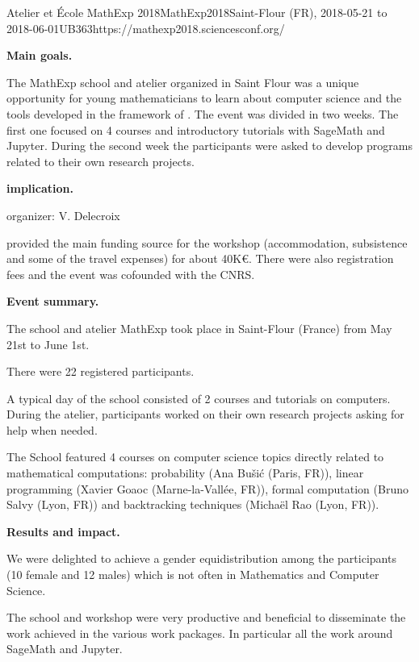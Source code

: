 \begin{event}{Atelier et \'Ecole MathExp 2018}{MathExp2018}{Saint-Flour (FR),
2018-05-21 to 2018-06-01}{UB}{36}{3}{https://mathexp2018.sciencesconf.org/}

\textbf{Main goals.}

The MathExp school and atelier organized in Saint Flour was a unique
opportunity for young mathematicians to learn about computer science
and the tools developed in the framework of \ODK. The event
was divided in two weeks. The first one focused on 4 courses and
introductory tutorials with SageMath and Jupyter. During the second
week the participants were asked to develop programs related to their
own research projects.

\textbf{\ODK implication.}

\ODK organizer: V. Delecroix

\ODK provided the main funding source for the workshop (accommodation,
subsistence and some of the travel expenses) for about 40K\euro. There were
also registration fees and the event was cofounded with the CNRS.

\textbf{Event summary.}

The school and atelier MathExp took place in Saint-Flour (France)
from May 21st to June 1st.

There were 22 registered participants.

A typical day of the school consisted of 2 courses and tutorials
on computers. During the atelier, participants worked on their
own research projects asking for help when needed.

The School featured 4 courses on computer science topics directly
related to mathematical computations: probability (Ana Bušić (Paris, FR)),
linear programming (Xavier Goaoc (Marne-la-Vallée, FR)), formal computation
(Bruno Salvy (Lyon, FR)) and backtracking techniques (Michaël Rao (Lyon, FR)).

\textbf{Results and impact.}

We were delighted to achieve a gender equidistribution among the participants
(10 female and 12 males) which is not often in Mathematics and Computer
Science.

The school and workshop were very productive and beneficial to disseminate
the work achieved in the various work packages. In particular
all the work around SageMath and Jupyter.

\end{event}
